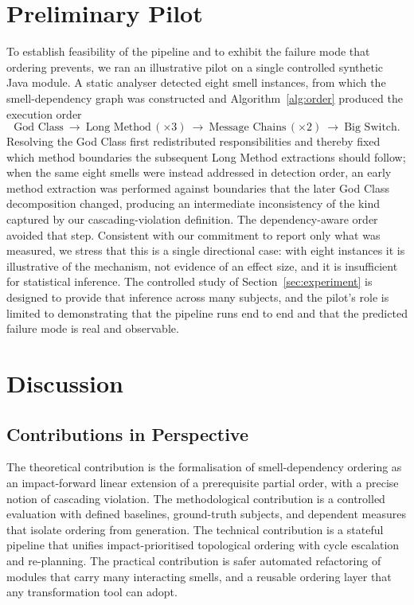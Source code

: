 \documentclass[journal,onecolumn,11pt]{IEEEtran}
\begin{document}
\section{Preliminary Pilot}
\label{sec:pilot}
To establish feasibility of the pipeline and to exhibit the failure mode that ordering prevents, we ran an illustrative pilot on a single controlled synthetic Java module. A static analyser detected eight smell instances, from which the smell-dependency graph was constructed and Algorithm~\ref{alg:order} produced the execution order
\[
\text{God Class}\ \rightarrow\ \text{Long Method}\,(\times 3)\ \rightarrow\ \text{Message Chains}\,(\times 2)\ \rightarrow\ \text{Big Switch}.
\]
Resolving the God Class first redistributed responsibilities and thereby fixed which method boundaries the subsequent Long Method extractions should follow; when the same eight smells were instead addressed in detection order, an early method extraction was performed against boundaries that the later God Class decomposition changed, producing an intermediate inconsistency of the kind captured by our cascading-violation definition. The dependency-aware order avoided that step. Consistent with our commitment to report only what was measured, we stress that this is a single directional case: with eight instances it is illustrative of the mechanism, not evidence of an effect size, and it is insufficient for statistical inference. The controlled study of Section~\ref{sec:experiment} is designed to provide that inference across many subjects, and the pilot's role is limited to demonstrating that the pipeline runs end to end and that the predicted failure mode is real and observable.

\section{Discussion}
\subsection{Contributions in Perspective}
The theoretical contribution is the formalisation of smell-dependency ordering as an impact-forward linear extension of a prerequisite partial order, with a precise notion of cascading violation. The methodological contribution is a controlled evaluation with defined baselines, ground-truth subjects, and dependent measures that isolate ordering from generation. The technical contribution is a stateful pipeline that unifies impact-prioritised topological ordering with cycle escalation and re-planning. The practical contribution is safer automated refactoring of modules that carry many interacting smells, and a reusable ordering layer that any transformation tool can adopt.
\end{document}

